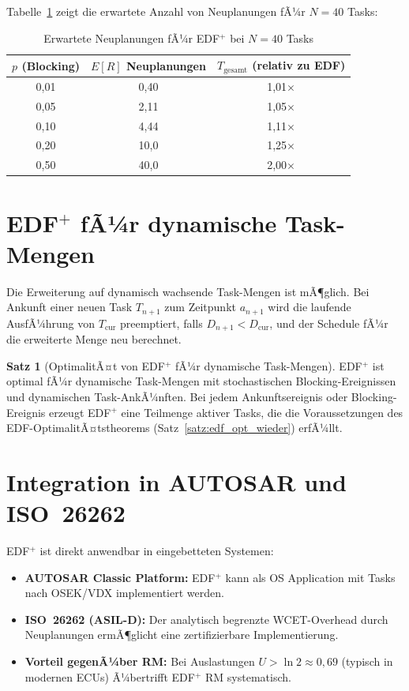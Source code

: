 ﻿\documentclass[a4paper,12pt]{report}
\theoremstyle{definition}
\newtheorem{satz}{Satz}[chapter]
\begin{document}
Tabelle~\ref{tab:edfplus_blocking} zeigt die erwartete Anzahl von Neuplanungen
fÃ¼r $N = 40$ Tasks:

\begin{table}[H]
	\centering
	\caption{Erwartete Neuplanungen fÃ¼r EDF$^+$ bei $N=40$ Tasks}
	\label{tab:edfplus_blocking}
	\begin{tabular}{ccc}
		\toprule
		$p$ (Blocking) & $E[R]$ Neuplanungen & $T_{\text{gesamt}}$ (relativ zu EDF) \\
		\midrule
		0{,}01 & 0{,}40  & 1{,}01$\times$ \\
		0{,}05 & 2{,}11  & 1{,}05$\times$ \\
		0{,}10 & 4{,}44  & 1{,}11$\times$ \\
		0{,}20 & 10{,}0  & 1{,}25$\times$ \\
		0{,}50 & 40{,}0  & 2{,}00$\times$ \\
		\bottomrule
	\end{tabular}
\end{table}

\section{EDF$^+$ fÃ¼r dynamische Task-Mengen}

Die Erweiterung auf dynamisch wachsende Task-Mengen ist mÃ¶glich. Bei Ankunft
einer neuen Task $T_{n+1}$ zum Zeitpunkt $a_{n+1}$ wird die laufende AusfÃ¼hrung
von $T_{\text{cur}}$ preemptiert, falls $D_{n+1} < D_{\text{cur}}$, und der
Schedule fÃ¼r die erweiterte Menge neu berechnet.

\begin{satz}[OptimalitÃ¤t von EDF$^+$ fÃ¼r dynamische Task-Mengen]
	EDF$^+$ ist optimal fÃ¼r dynamische Task-Mengen mit stochastischen
	Blocking-Ereignissen und dynamischen Task-AnkÃ¼nften. Bei jedem
	Ankunftsereignis oder Blocking-Ereignis erzeugt EDF$^+$ eine Teilmenge
	aktiver Tasks, die die Voraussetzungen des EDF-OptimalitÃ¤tstheorems
	(Satz~\ref{satz:edf_opt_wieder}) erfÃ¼llt.
\end{satz}

\section{Integration in AUTOSAR und ISO~26262}

EDF$^+$ ist direkt anwendbar in eingebetteten Systemen:

\begin{itemize}
	\item \textbf{AUTOSAR Classic Platform:} EDF$^+$ kann als OS Application
	      mit Tasks nach OSEK/VDX implementiert werden.
	\item \textbf{ISO~26262 (ASIL-D):} Der analytisch begrenzte WCET-Overhead
	      durch Neuplanungen ermÃ¶glicht eine zertifizierbare Implementierung.
	\item \textbf{Vorteil gegenÃ¼ber RM:} Bei Auslastungen $U > \ln 2 \approx 0{,}69$
	      (typisch in modernen ECUs) Ã¼bertrifft EDF$^+$ RM systematisch.
\end{itemize}
\end{document}
